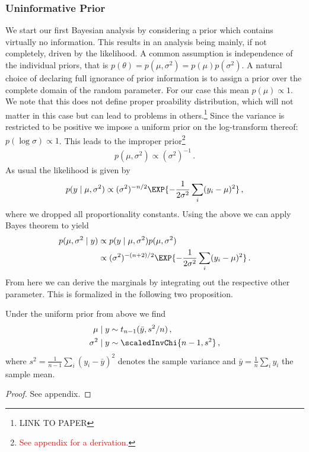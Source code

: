 \subsubsection*{Uninformative Prior}
We start our first Bayesian analysis by considering a prior which contains virtually no information.
This results in an analysis being mainly, if not completely, driven by the likelihood.
A common assumption is independence of the individual priors, that is $p(\theta) = p(\mu, \sigma^2) = p(\mu) p(\sigma^2)$.
A natural choice of declaring full ignorance of prior information is to assign a prior over the complete domain of the random parameter. For our case this mean $p(\mu) \propto 1$.
We note that this does not define proper proability distribution, which will not matter in this case but can lead to problems in others.\footnote{LINK TO PAPER}
Since the variance is restricted to be positive we impose a uniform prior on the log-transform thereof: $p(\log \sigma) \propto 1$.
This leads to the improper prior\footnote{\textcolor{red}{See appendix for a derivation.}}
\begin{align}
  p(\mu, \sigma^2) \propto (\sigma^2)^{-1} \,.
\end{align}
As usual the likelihood is given by
\begin{align}
  p(y \mid \mu, \sigma^2) \propto (\sigma^2)^{-n/2} \EXP{-\frac{1}{2\sigma^2}\sum_i (y_i - \mu)^2} \,,
\end{align}
where we dropped all proportionality constants.
Using the above we can apply Bayes theorem to yield
\begin{align}
  p(\mu, \sigma^2 \mid y) &\propto p(y \mid \mu, \sigma^2) p(\mu, \sigma^2)\\
  &\propto (\sigma^2)^{-(n+2)/2} \EXP{-\frac{1}{2\sigma^2}\sum_i (y_i - \mu)^2} \,.
\end{align}
From here we can derive the marginals by integrating out the respective other parameter. This is formalized in the following two proposition.

\begin{proposition}
  Under the uniform prior from above we find
  \begin{align}
    \mu \mid y &\sim t_{n-1}(\bar{y}, s^2/n) \,,\\
    \sigma^2 \mid y &\sim \scaledInvChi{n-1, s^2} \,,
  \end{align}
  where $s^2 = \frac{1}{n-1} \sum_i (y_i - \bar{y})^2$ denotes the sample variance and $\bar{y} = \frac{1}{n} \sum_i y_i$ the sample mean.
\end{proposition}
\begin{proof}
See appendix.
\end{proof}

